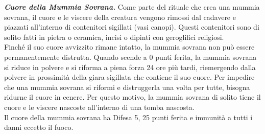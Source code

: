 \begin{multicols}{2}
\emph{\textbf{Cuore della Mummia Sovrana.}} Come parte del rituale che crea una mummia sovrana, il cuore e le viscere della creatura vengono rimossi dal cadavere e piazzati all'interno di contenitori sigillati (vasi canopi). Questi contenitori sono di solito fatti in pietra o ceramica, incisi o dipinti con geroglifici religiosi.\\

Finché il suo cuore avvizzito rimane intatto, la mummia sovrana non può essere permanentemente distrutta. Quando scende a 0 punti ferita, la mummia sovrana si riduce in polvere e si riforma a piena forza 24 ore più tardi, riemergendo dalla polvere in prossimità della giara sigillata che contiene il suo cuore. Per impedire che una mummia sovrana si riformi e distruggerla una volta per tutte, bisogna ridurne il cuore in cenere. Per questo motivo, la mummia sovrana di solito tiene il cuore e le viscere nascoste all'interno di una tomba nascosta.\\
Il cuore della mummia sovrana ha Difesa 5, 25 punti ferita e immunità a tutti i danni eccetto il fuoco.


\end{multicols}
